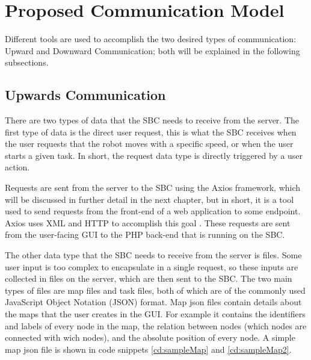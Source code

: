 \section{Proposed Communication Model} %
Different tools are used to accomplish the two desired types of communication: Upward and Downward Communication; both will be explained in the following subsections.
\newpage
\subsection{Upwards Communication}
There are two types of data that the SBC needs to receive from the server. The first type of data is the direct user request, this is what the SBC receives when the user requests that the robot moves with a specific speed, or when the user starts a given task. In short, the request data type is directly triggered by a user action.

Requests are sent from the server to the SBC using the Axios framework, which will be discussed in further detail in the next chapter, but in short, it is a tool used to send requests from the front-end of a web application to some endpoint. Axios uses XML and HTTP to accomplish this goal \cite{axios-intro}. These requests are sent from the user-facing GUI to the PHP back-end that is running on the SBC.

The other data type that the SBC needs to receive from the server is files. Some user input is too complex to encapsulate in a single request, so these inputs are collected in files on the server, which are then sent to the SBC. The two main types of files are map files and task files, both of which are of the commonly used JavaScript Object Notation (JSON) format. Map json files contain details about the maps that the user creates in the GUI. For example it contains the identifiers and labels of every node in the map, the relation between nodes (which nodes are connected with wich nodes), and the absolute position of every node. A simple map json file is shown in code snippets \ref{cd:sampleMap} and \ref{cd:sampleMap2}.



\newpage



